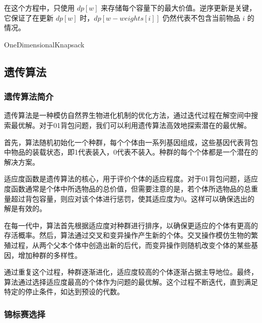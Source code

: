 \documentclass[UTF8,titlepage]{ctexart}
\numberwithin{figure}{section}
\begin{document}
在这个方程中，只使用 $dp[w]$ 来存储每个容量下的最大价值。逆序更新是关键，它保证了在更新 $dp[w]$ 时，$dp[w-weights[i]]$ 仍然代表不包含当前物品 $i$ 的情况。

\begin{algorithm}[H]
    \SetAlgoLined
    \DontPrintSemicolon
    \caption{OneDimensionalKnapsack}
    \end{algorithm}


\subsection{遗传算法}

\subsubsection{遗传算法简介}
遗传算法是一种模仿自然界生物进化机制的优化方法，通过迭代过程在解空间中搜索最优解。对于01背包问题，我们可以利用遗传算法高效地探索潜在的最优解。

首先，算法随机初始化一个种群，每个个体由一系列基因组成，这些基因代表背包中物品的装载状态，即1代表装入，0代表不装入。种群的每个个体都是一个潜在的解决方案。

适应度函数是遗传算法的核心，用于评价个体的适应程度。对于01背包问题，适应度函数通常是个体中所选物品的总价值，但需要注意的是，若个体所选物品的总重量超过背包容量，则应对该个体进行惩罚，使其适应度为0。这样可以确保选出的解是有效的。

在每一代中，算法首先根据适应度对种群进行排序，以确保更适应的个体有更高的存活概率。然后，算法通过交叉和变异操作产生新的个体。交叉操作模仿生物的繁殖过程，从两个父本个体中创造出新的后代，而变异操作则随机改变个体的某些基因，增加种群的多样性。

通过重复这个过程，种群逐渐进化，适应度较高的个体逐渐占据主导地位。最终，算法通过选择适应度最高的个体作为问题的最优解。这个过程不断迭代，直到满足特定的停止条件，如达到预设的代数。

    
\subsubsection{锦标赛选择}
\end{document}
